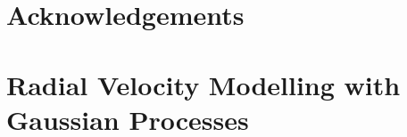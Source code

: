 \documentclass[12pt, twoside]{report}
\begin{document}


\iffalse
\chapter*{Abstract}
Abstract goes here
\chapter*{Dedication}
To mum and dad
\chapter*{Declaration}
I declare that..
\fi

\chapter*{Acknowledgements}


\tableofcontents





%
%
%
\chapter{Radial Velocity Modelling with Gaussian Processes} \label{chp:gp}

%

%

\printbibliography
\end{document}

